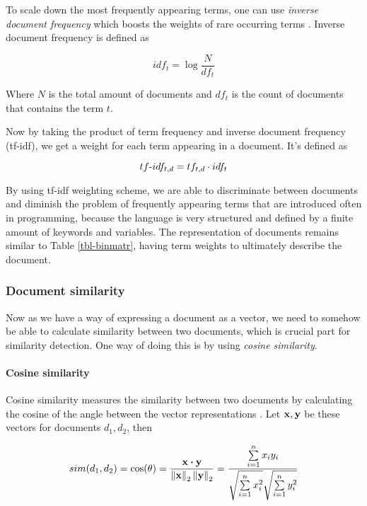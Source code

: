 To scale down the most frequently appearing terms, one can use \emph{inverse document frequency} which boosts the weights of rare occurring terms \cite{Manning:2008:IIR:1394399}. Inverse document frequency is defined as

\begin{equation}
    idf_t = \log \dfrac{N}{df_t}
\end{equation}

\noindent
Where $N$ is the total amount of documents and $df_{t}$ is the count of documents that contains the term $t$.

Now by taking the product of term frequency and inverse document frequency (tf-idf), we get a weight for each term appearing in a document. It's defined as

\begin{equation}
    tf{\text -}idf_{t, d} = tf_{t, d} \cdot idf_{t}
\end{equation}

By using tf-idf weighting scheme, we are able to discriminate between documents and diminish the problem of frequently appearing terms that are introduced often in programming, because the language is very structured and defined by a finite amount of keywords and variables. The representation of documents remains similar to Table \ref{tbl-binmatr}, having term weights to ultimately describe the document.

\subsubsection{Document similarity} \label{chap-bg-sim}

Now as we have a way of expressing a document as a vector, we need to somehow be able to calculate similarity between two documents, which is crucial part for similarity detection. One way of doing this is by using \emph{cosine similarity}.

\paragraph{Cosine similarity}

Cosine similarity measures the similarity between two documents by calculating the cosine of the angle between the vector representations \cite{Manning:2008:IIR:1394399}. Let $\mathbf{x}, \mathbf{y}$ be these vectors for documents $d_1, d_2$, then

\begin{equation} \label{eq-cosine-orig}
    sim(d_1, d_2) = \cos(\theta) = \dfrac{\mathbf{x} \boldsymbol{\cdot} \mathbf{y}}
                          {\left\lVert\mathbf{x}\right\rVert_2 \left\lVert\mathbf{y}\right\rVert_2} = 
                          \dfrac{\sum \limits_{i=1}^n x_i y_i}
                                {\sqrt{\sum \limits_{i=1}^n {x}_i^2} \sqrt{\sum \limits_{i=1}^n y_i^2}}
\end{equation}

